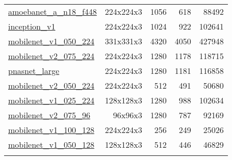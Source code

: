 \begin{table}[]
\begin{tabular}{lrrrr}
\href{https://tfhub.dev/google/imagenet/amoebanet\_a\_n18\_f448/feature\_vector/1}{amoebanet\_a\_n18\_f448} \cite{real2018regularized} & 224x224x3 & 1056   & 618          & 88492                    \\
\href{https://tfhub.dev/google/imagenet/inception\_v1/feature\_vector/1}{inception\_v1} \cite{szegedy2015going}                        & 224x224x3 & 1024   & 922          & 102641                   \\
\href{https://tfhub.dev/google/imagenet/mobilenet\_v1\_050\_224/feature\_vector/1}{mobilenet\_v1\_050\_224} \cite{howard2018inverted}  & 331x331x3 & 4320   & 4050         & 427948                   \\
\href{https://tfhub.dev/google/imagenet/mobilenet\_v2\_075\_224/feature\_vector/2}{mobilenet\_v2\_075\_224} \cite{howard2018inverted}  & 224x224x3 & 1280   & 1178         & 118715                   \\
\href{https://tfhub.dev/google/imagenet/pnasnet\_large/feature\_vector/2}{pnasnet\_large} \cite{liu2018progressive}                    & 224x224x3 & 1280   & 1181         & 116858                   \\
\href{https://tfhub.dev/google/imagenet/mobilenet\_v2\_050\_224/feature\_vector/2}{mobilenet\_v2\_050\_224} \cite{howard2018inverted}  & 224x224x3 & 512    & 491          & 50680                    \\
\href{https://tfhub.dev/google/imagenet/mobilenet\_v1\_025\_224/feature\_vector/1}{mobilenet\_v1\_025\_224} \cite{howard2018inverted}  & 128x128x3 & 1280   & 988          & 102634                   \\
\href{https://tfhub.dev/google/imagenet/mobilenet\_v2\_075\_96/feature\_vector/2}{mobilenet\_v2\_075\_96} \cite{howard2018inverted}    & 96x96x3   & 1280   & 787          & 92169                    \\
\href{https://tfhub.dev/google/imagenet/mobilenet\_v1\_100\_128/feature\_vector/1}{mobilenet\_v1\_100\_128} \cite{howard2018inverted}  & 224x224x3 & 256    & 249          & 25026                    \\
\href{https://tfhub.dev/google/imagenet/mobilenet\_v1\_050\_128/feature\_vector/1}{mobilenet\_v1\_050\_128} \cite{howard2018inverted}  & 128x128x3 & 512    & 446          & 46829                    \\
                                                                                                                                       &           &        &              &                          \\

\end{tabular}
\end{table}
